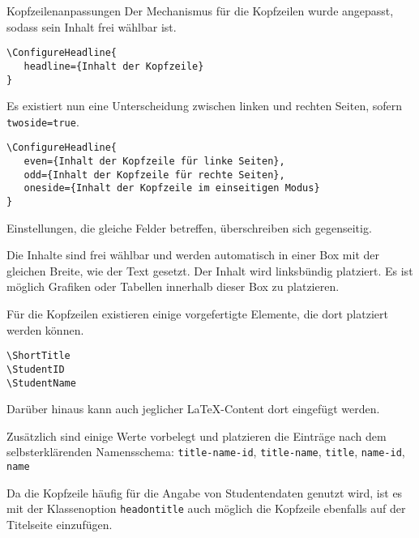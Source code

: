 \documentclass[
	german,%
	accentcolor=9c,%
	points=true, für die Aktivierung der Punktereferenzen
]{tudaexercise}
\newcommand*{\code}[1]{\texttt{#1}}
\begin{document}
\begin{task}{Kopfzeilenanpassungen}
	Der Mechanismus für die Kopfzeilen wurde angepasst, sodass sein Inhalt frei wählbar ist.

\begin{verbatim}
\ConfigureHeadline{
   headline={Inhalt der Kopfzeile}
}
\end{verbatim}

	Es existiert nun eine Unterscheidung zwischen linken und rechten Seiten, sofern \code{twoside=true}.

\begin{verbatim}
\ConfigureHeadline{
   even={Inhalt der Kopfzeile für linke Seiten},
   odd={Inhalt der Kopfzeile für rechte Seiten},
   oneside={Inhalt der Kopfzeile im einseitigen Modus}
}
\end{verbatim}

	Einstellungen, die gleiche Felder betreffen, überschreiben sich gegenseitig.

	\begin{subtask}[title={Freie Inhalte}]
		Die Inhalte sind frei wählbar und werden automatisch in einer Box mit der gleichen Breite, wie der Text gesetzt. Der Inhalt wird linksbündig platziert. Es ist möglich Grafiken oder Tabellen innerhalb dieser Box zu platzieren.
	\end{subtask}

	\begin{subtask}[title={Vorgefertigte Elemente}]
		Für die Kopfzeilen existieren einige vorgefertigte Elemente, die dort platziert werden können.
\begin{verbatim}
\ShortTitle
\StudentID
\StudentName
\end{verbatim}
		Darüber hinaus kann auch jeglicher \LaTeX-Content dort eingefügt werden.

		Zusätzlich sind einige Werte vorbelegt und platzieren die Einträge nach dem selbsterklärenden Namensschema:
		\code{title-name-id}, \code{title-name}, \code{title}, \code{name-id}, \code{name}
	\end{subtask}

	\begin{subtask}[title={Kopfzeile auch auf der Titelseite}]
		Da die Kopfzeile häufig für die Angabe von Studentendaten genutzt wird, ist es mit der Klassenoption \code{headontitle} auch möglich die Kopfzeile ebenfalls auf der Titelseite einzufügen.
	\end{subtask}
\end{task}
\end{document}
